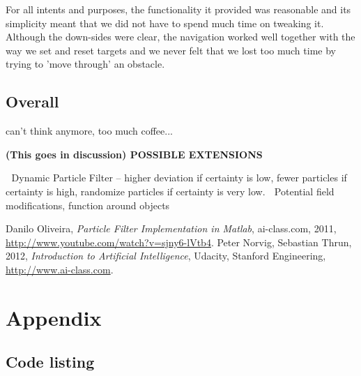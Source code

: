 \documentclass[paper=a4, fontsize=12pt]{scrartcl}	%
\numberwithin{equation}{section}		%
\numberwithin{figure}{section}			%
\numberwithin{table}{section}				%
\begin{document}
For all intents and purposes, the functionality it provided was reasonable and its simplicity meant that we did not have to spend much time on tweaking it. Although the down-sides were clear, the navigation worked well together with the way we set and reset targets and we never felt that we lost too much time by trying to 'move through' an obstacle.

\subsection{Overall}
can't think anymore, too much coffee...


\textbf{(This goes in discussion) POSSIBLE EXTENSIONS}

	Dynamic Particle Filter – higher deviation if certainty is low, fewer particles if certainty is high, randomize particles if certainty is very low.
	Potential field modifications, function around objects

\begin{thebibliography}{9}
  Danilo Oliveira,
  \emph{Particle Filter Implementation in Matlab},
  ai-class.com,
  2011,
  \url{http://www.youtube.com/watch?v=sjny6-lVtb4}.
  Peter Norvig, Sebastian Thrun,
  2012,
  \emph{Introduction to Artificial Intelligence},
  Udacity, Stanford Engineering,
  \url{http://www.ai-class.com}.
\end{thebibliography}
\section{Appendix}
\subsection{Code listing}

\end{document}
